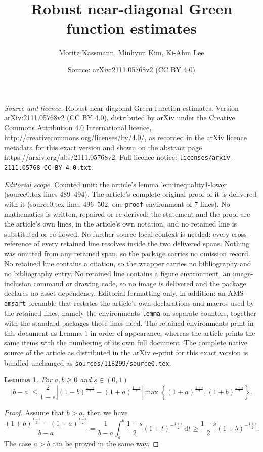 \documentclass[10pt,a4paper]{amsart}
\title{Robust near-diagonal Green function estimates}
\author{Moritz Kassmann, Minhyun Kim, Ki-Ahm Lee}
\date{Source: arXiv:2111.05768v2 (CC BY 4.0)}
\newtheorem{lemma}{Lemma}
\newcommand{\dt} {\, \mathrm{d}t}
\begin{document}
\maketitle

\noindent\emph{Source and licence.} Robust near-diagonal Green function estimates. Version arXiv:2111.05768v2 (CC BY 4.0), distributed by arXiv under the Creative Commons Attribution 4.0 International licence, http://creativecommons.org/licenses/by/4.0/, as recorded in the arXiv licence metadata for this exact version and shown on the abstract page https://arxiv.org/abs/2111.05768v2. Full licence notice: \texttt{licenses/arxiv-2111.05768-CC-BY-4.0.txt}.\par\smallskip

\noindent\textit{Editorial scope.} Counted unit: the article's lemma lem:inequality1-lower (source0.tex lines 489--494). The article's complete original proof of it is delivered with it (source0.tex lines 496--502, one \texttt{proof} environment of 7 lines). No mathematics is written, repaired or re-derived: the statement and the proof are the article's own lines, in the article's own notation, and no retained line is substituted or re-flowed.  No further source-local context is needed: every cross-reference of every retained line resolves inside the two delivered spans.  Nothing was omitted from any retained span, so the package carries no omission record.  No retained line contains a citation, so the wrapper carries no bibliography and no bibliography entry.  No retained line contains a figure environment, an image-inclusion command or drawing code, so no image is delivered and the package declares no asset dependency.  Editorial formatting only, in addition: an AMS \texttt{amsart} preamble that restates the article's own declarations and macros used by the retained lines, namely the environments \texttt{lemma} on separate counters, together with the standard packages those lines need.  The retained environments print in this document as Lemma 1 in order of appearance, whereas the article prints the same items with the numbering of its own full document.  The complete native source of the article as distributed in the arXiv e-print for this exact version is bundled unchanged as \texttt{sources/118299/source0.tex}.
\begin{lemma} \label{lem:inequality1-lower}
For $a, b \geq 0$ and $s \in (0, 1)$
\begin{equation*}
|b-a| \leq \frac{2}{1-s} \left| (1+b)^{\frac{1-s}{2}} - (1+a)^{\frac{1-s}{2}} \right| \max\left\lbrace (1+a)^{\frac{1+s}{2}}, (1+b)^{\frac{1+s}{2}} \right\rbrace.
\end{equation*}
\end{lemma}

\begin{proof}
Assume that $b > a$, then we have
\begin{equation*}
\frac{(1+b)^{\frac{1-s}{2}}-(1+a)^{\frac{1-s}{2}}}{b-a} = \frac{1}{b-a} \int_a^b \frac{1-s}{2} (1+t)^{-\frac{1+s}{2}} \dt \geq \frac{1-s}{2} (1+b)^{-\frac{1+s}{2}}.
\end{equation*}
The case $a > b$ can be proved in the same way.
\end{proof}
\end{document}

